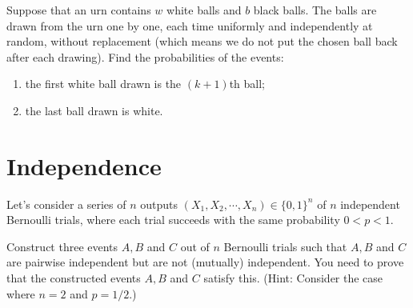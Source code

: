 \documentclass[a4paper, justified]{tufte-handout}
\begin{document}
\begin{solution}

\end{solution}

\begin{problem}
  Suppose that an urn contains \(w\) white balls and \(b\) black balls. The balls are drawn from the urn one by one, each time uniformly and independently at random, without replacement (which means we do not put the chosen ball back after each drawing). Find the probabilities of the events:
  \begin{enumerate}
    \item the first white ball drawn is the \((k+1)\)th ball;
    \item the last ball drawn is white.
  \end{enumerate}
\end{problem}

\begin{solution}
  
\end{solution}

\section{Independence}

  Let's consider a series of \(n\) outputs \((X_1, X_2, \cdots, X_n) \in \{0,1\}^n\) of \(n\) independent Bernoulli trials, where each trial succeeds with the same probability \(0 < p < 1\).
\begin{problem}
    Construct three events \(A,B\) and \(C\) out of \(n\) Bernoulli trials such that \(A, B\) and \(C\) are pairwise independent but are not (mutually) independent. You need to prove that the constructed events \(A, B\) and \(C\) satisfy this. (Hint: Consider the case where \(n = 2\) and \(p = 1/2\).)
\end{problem}

\begin{solution}
  
\end{solution}
\end{document}
